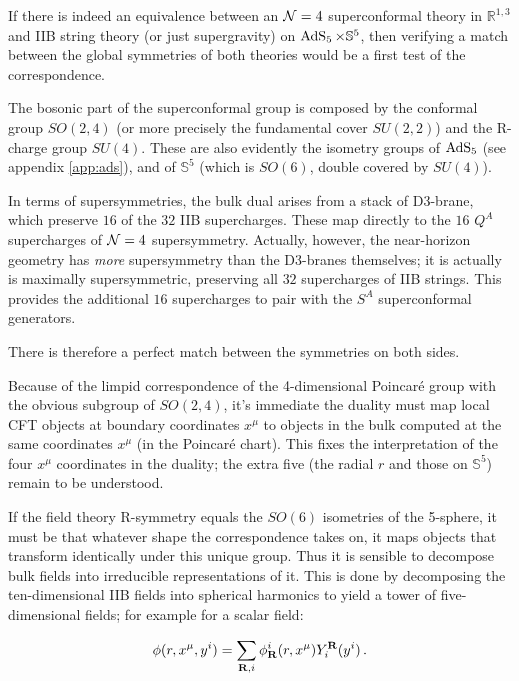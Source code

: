 If there is indeed an equivalence between an $\mathcal{N} = 4$ superconformal theory in $\mathbb{R}^{1,3}$ and IIB string theory (or just supergravity) on $\operatorname{AdS}_{5}\times\mathbb{S}^5$, then verifying a match between the global symmetries of both theories would be a first test of the correspondence.

The bosonic part of the superconformal group is composed by the conformal group $SO(2,4)$ (or more precisely the fundamental cover $SU(2,2)$) and the R-charge group $SU(4)$. These are also evidently the isometry groups of $\operatorname{AdS}_{5}$ (see appendix \ref{app:ads}), and of $\mathbb{S}^5$ (which is $SO(6)$, double covered by $SU(4)$).

In terms of supersymmetries, the bulk dual arises from a stack of D3-brane, which preserve $16$ of the $32$ IIB supercharges. These map directly to the $16$ $Q^A$ supercharges of $\mathcal{N} = 4$ supersymmetry. Actually, however, the near-horizon geometry has \emph{more} supersymmetry than the D3-branes themselves; it is actually is maximally supersymmetric, preserving all $32$ supercharges of IIB strings. This provides the additional $16$ supercharges to pair with the $S^A$ superconformal generators.

There is therefore a perfect match between the symmetries on both sides.

Because of the limpid correspondence of the 4-dimensional Poincar\'e group with the obvious subgroup of $SO(2,4)$, it's immediate the duality must map local CFT objects at boundary coordinates $x^\mu$ to objects in the bulk computed at the same coordinates $x^\mu$ (in the Poincar\'e chart). This fixes the interpretation of the four $x^\mu$ coordinates in the duality; the extra five (the radial $r$ and those on $\mathbb{S}^5$) remain to be understood.

If the field theory R-symmetry equals the $SO(6)$ isometries of the 5-sphere, it must be that whatever shape the correspondence takes on, it maps objects that transform identically under this unique group. Thus it is sensible to decompose bulk fields into irreducible representations of it. This is done by decomposing the ten-dimensional IIB fields into spherical harmonics to yield a tower of five-dimensional fields; for example for a scalar field:

\begin{equation}
	\phi(r,x^\mu,y^i) = \sum_{\mathbf{R},i}  \phi_{\mathbf{R}}^i(r,x^\mu) Y^{\mathbf{R}}_i (y^i)\,.
	\label{}
\end{equation}

